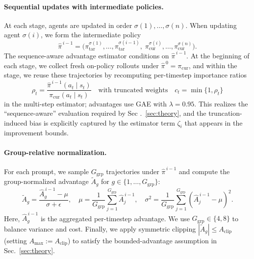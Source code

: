 \documentclass[sigconf]{aamas}
\begin{document}
\paragraph{Sequential updates with intermediate policies.}
At each stage, agents are updated in order $\sigma(1),\ldots,\sigma(n)$. When updating agent $\sigma(i)$, we form the intermediate policy
\begin{equation}
\hat{\pi}^{\,i-1}
=\big(\pi^{\sigma(1)}_{\mathrm{tar}},\ldots,\pi^{\sigma(i-1)}_{\mathrm{tar}},\;
\pi^{\sigma(i)}_{\mathrm{cur}},\ldots,\pi^{\sigma(n)}_{\mathrm{cur}}\big).
\end{equation}
The sequence-aware advantage estimator conditions on $\hat{\pi}^{\,i-1}$. At the beginning of each stage, we collect fresh on-policy rollouts under $\hat{\pi}^{\,0}=\pi_{\mathrm{cur}}$, and within the stage, we reuse these trajectories by recomputing per-timestep importance ratios
\[
\rho_t=\frac{\hat{\pi}^{\,i-1}(a_t\mid s_t)}{\pi_{\mathrm{cur}}(a_t\mid s_t)}
\quad\text{with truncated weights}\quad
c_t=\min\{1,\rho_t\}
\]
in the multi-step estimator; advantages use GAE with $\lambda=0.95$. This realizes the “sequence-aware” evaluation required by Sec .~\ref {sec:theory}, and the truncation-induced bias is explicitly captured by the estimator term $\zeta_i$ that appears in the improvement bounds.

\paragraph{Group-relative normalization.}
For each prompt, we sample $G_{\text{grp}}$ trajectories under $\hat{\pi}^{\,i-1}$ and compute the group-normalized advantage $\tilde A_{g}$ for $g\in\{1,\ldots,G_{\text{grp}}\}$:
\begin{equation}
    \tilde A_{g} = \frac{\widehat A^{\,i-1}_{g}-\mu}{\sigma+\epsilon}, \quad 
    \mu = \frac{1}{G_{\text{grp}}}\sum_{j=1}^{G_{\text{grp}}}\widehat A^{\,i-1}_{j}, \quad 
    \sigma^2 = \frac{1}{G_{\text{grp}}}\sum_{j=1}^{G_{\text{grp}}}(\widehat A^{\,i-1}_{j}-\mu)^2.
\end{equation}
Here, $\widehat A^{\,i-1}_{g}$ is the aggregated per-timestep advantage. We use $G_{\text{grp}}\in\{4,8\}$ to balance variance and cost. Finally, we apply symmetric clipping $|\tilde A_{g}|\le A_{\text{clip}}$ (setting $A_{\max}:=A_{\text{clip}}$) to satisfy the bounded-advantage assumption in Sec.~\ref{sec:theory}.
\end{document}
